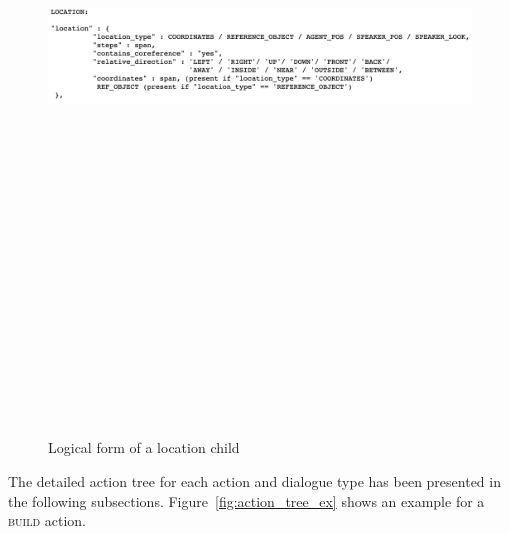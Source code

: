 \begin{figure}[h]
    \centering
    \includegraphics[width=15cm,height=20cm,keepaspectratio]{figures/location.png}
    \caption{Logical form of a location child}
    \label{fig:location}
\end{figure}
The detailed action tree for each action and dialogue type has been presented in the following subsections. Figure~\ref{fig:action_tree_ex} shows an example for a \textsc{build} action.


